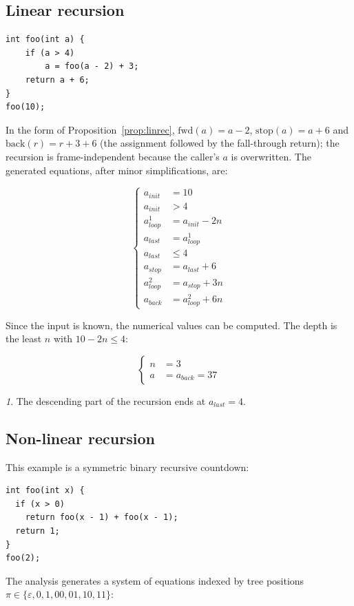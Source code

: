 \documentclass[oneside,english]{amsart}
\numberwithin{equation}{section}
\numberwithin{figure}{section}
\theoremstyle{plain}
\theoremstyle{definition}
\theoremstyle{plain}
\theoremstyle{remark}
\newtheorem*{rem*}{\protect\remarkname}
\theoremstyle{plain}
\theoremstyle{definition}
\theoremstyle{plain}
\theoremstyle{remark}
\providecommand{\remarkname}{Remark}
\begin{document}
\subsection{Linear recursion}

\begin{lstlisting}
int foo(int a) {
    if (a > 4)
        a = foo(a - 2) + 3;
    return a + 6;
}
foo(10);
\end{lstlisting}

In the form of Proposition~\ref{prop:linrec}, $\text{fwd}(a) = a - 2$, $\text{stop}(a) = a + 6$ and $\text{back}(r) = r + 3 + 6$ (the assignment followed by the fall-through return); the recursion is frame-independent because the caller's $a$ is overwritten. The generated equations, after minor simplifications, are:

\[
\begin{cases}
a_{init} & =10\\
a_{init} & >4\\
a_{loop}^{1} & =a_{init}-2n\\
a_{last} & =a_{loop}^{1}\\
a_{last} & \leq4\\
a_{stop} & =a_{last}+6\\
a_{loop}^{2} & =a_{stop}+3n\\
a_{back} & =a_{loop}^{2}+6n
\end{cases}
\]

Since the input is known, the numerical values can be computed. The depth is the least $n$ with $10 - 2n \le 4$:

\[
\begin{cases}
n & =3\\
a & =a_{back}=37
\end{cases}
\]

\begin{rem*}
The descending part of the recursion ends at $a_{last}=4$.
\end{rem*}

\subsection{Non-linear recursion}
This example is a symmetric binary recursive countdown:

\begin{lstlisting}
int foo(int x) {
  if (x > 0)
    return foo(x - 1) + foo(x - 1);
  return 1;
}
foo(2);
\end{lstlisting}

The analysis generates a system of equations indexed by tree positions $\pi \in \{\varepsilon, 0, 1, 00, 01, 10, 11\}$:
\end{document}

